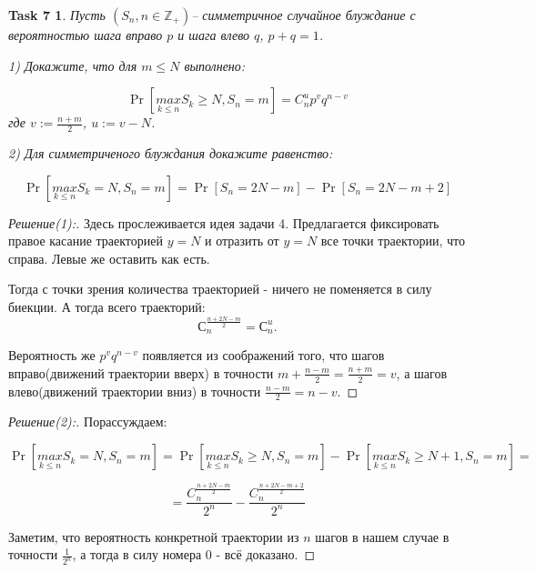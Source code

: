 \documentclass{article}
\newtheorem*{task7}{Task 7}
\newcommand{\Z}{\mathbb{Z}}
\begin{document}
       
       
        \vspace{\baselineskip}
   
        
        \begin{task7}
            Пусть $(S_n, n\in \Z_+)$-- симметричное случайное блуждание с вероятностью шага вправо $p$ и шага влево $q$, $p + q = 1$. 
            
            1) Докажите, что для $m \leq N$ выполнено:
            
            \[
            \Pr[\underset{k \leq n}{max} S_k \geq N, S_n = m] = C_{n}^{u} p^v q^{n-v}
            \]
где $v := \frac{n + m}{2}$, $u := v - N$.

            2) Для симметриченого блуждания докажите равенство:
            
            \[
            \Pr[\underset{k \leq n}{max} S_k = N, S_n = m] = \Pr[S_n = 2N - m] - \Pr[S_n = 2N - m + 2]
            \]
        \end{task7}
        
        
        \begin{proof}[Решение(1):]
        
        \vspace{\baselineskip}
        
        Здесь прослеживается идея задачи 4. Предлагается фиксировать правое касание траекторией $y = N$ и отразить от $y = N$ все точки траектории, что справа. Левые же оставить как есть.
        
        Тогда с точки зрения количества траекторией - ничего не поменяется в силу биекции. А тогда всего траекторий:
        \[
        С_{n}^{\frac{n + 2N - m}{2}} = С_{n}^{u}.
        \]
        
        Вероятность же $p^v q^{n-v}$ появляется из соображений того, что шагов вправо(движений траектории вверх) в точности $m + \frac{n - m}{2} = \frac{n+m}{2} = v$, а шагов влево(движений траектории вниз) в точности $\frac{n-m}{2} = n - v$.
        \end{proof}
        
        \vspace{\baselineskip}
        
        \begin{proof}[Решение(2):]
        
        Порассуждаем:
        
        \[
        \Pr[\underset{k \leq n}{max} S_k = N, S_n = m] = \Pr[\underset{k \leq n}{max} S_k \geq N, S_n = m] -
        \Pr[\underset{k \leq n}{max} S_k \geq N + 1, S_n = m] =
        \]
        
        \[
        = \frac{C_{n}^{\frac{n + 2N - m}{2}}}{2^n} - \frac{C_{n}^{\frac{n + 2N - m + 2}{2}}}{2^n}
        \]
        
        Заметим, что вероятность конкретной траектории из $n$ шагов в нашем случае в точности $\frac{1}{2^n}$, а тогда в силу номера 0 - всё доказано.
        
        \end{proof}
        
\end{document}
